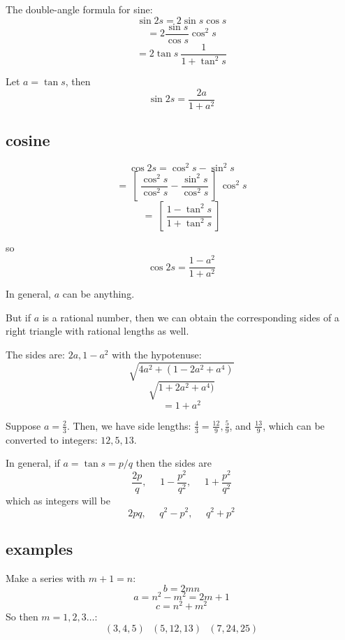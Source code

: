 \documentclass[11pt, oneside]{article}
\begin{document}
The double-angle formula for sine:
\[ \sin 2s = 2 \sin s \cos s \]
\[ = 2 \frac{\sin s}{\cos s} \cos^2 s \]
\[ = 2 \tan s \ \frac{1}{1 + \tan^2 s} \]

Let $a = \tan s$, then
\[ \sin 2s = \frac{2a}{1 + a^2} \]

\subsection*{cosine}

\[ \cos 2s = \cos^2 s - \sin^2 s \]
\[ = \ [ \ \frac{\cos^2 s}{\cos^2 s} - \frac{\sin^2 s}{\cos^2 s} \ ] \ \cos^2 s \]
\[ = \ [ \ \frac{1 - \tan^2 s}{1 + \tan^2 s} \ ] \]
 
so
\[ \cos 2s = \frac{1 - a^2}{1 + a^2} \]

In general, $a$ can be anything.  

But if $a$ is a rational number, then we can obtain the corresponding sides of a right triangle with rational lengths as well.  

The sides are:  $2a, 1 - a^2$ with the hypotenuse:
\[ \sqrt{4a^2 + (1 - 2a^2 + a^4)} \]
\[ \sqrt{1 + 2a^2 + a^4)} \]
\[ = 1 + a^2 \]

Suppose $a = \frac{2}{3}$.  Then, we have side lengths:  $\frac{4}{3} = \frac{12}{9},\frac{5}{9}$, and $\frac{13}{9}$, which can be converted to integers:  $12, 5, 13$.

In general, if $a = \tan s = p/q$ then the sides are
\[ \frac{2p}{q}, \ \ \ \ \ \ 1 - \frac{p^2}{q^2}, \ \ \ \ \ \ 1 +\frac{p^2}{q^2} \]
which as integers will be
\[ 2pq, \ \ \ \ \ \ q^2 - p^2, \ \ \ \ \ \ q^2 + p^2 \]

\subsection*{examples}

Make a series with $m + 1 = n$:
\[ b = 2mn \]
\[ a = n^2 - m^2 = 2m + 1 \]
\[ c = n^2 + m^2 \]
So then $m = 1,2,3 \dots$:
\[ (3,4,5) \ \ \ (5,12,13) \ \ \ (7,24,25)  \]
\end{document}
